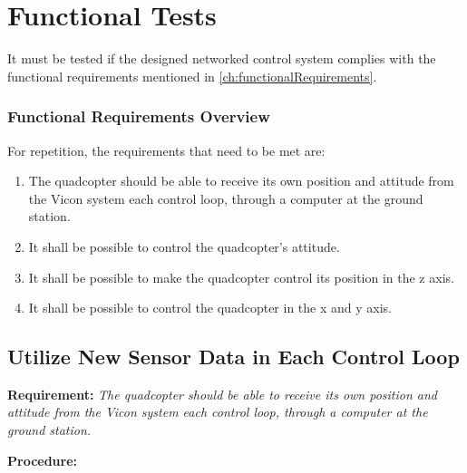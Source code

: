 \chapter{Functional Tests}
It must be tested if the designed networked control system complies with the functional requirements mentioned in \autoref{ch:functionalRequirements}. 

\subsection*{Functional Requirements Overview}
For repetition, the requirements that need to be met are:
\begin{enumerate}[label=\textbf{\arabic*})]
\item {The quadcopter should be able to receive its own position and attitude from the Vicon system each control loop, through a computer at the ground station.}
\item {It shall be possible to control the quadcopter's attitude.}
\item {It shall be possible to make the quadcopter control its position in the z axis.}
\item {It shall be possible to control the quadcopter in the x and y axis.}
\end{enumerate}

\section{Utilize New Sensor Data in Each Control Loop}
\textbf{Requirement:}
\textit{The quadcopter should be able to receive its own position and attitude from the Vicon system each control loop, through a computer at the ground station.}


\textbf{Procedure:}\\

